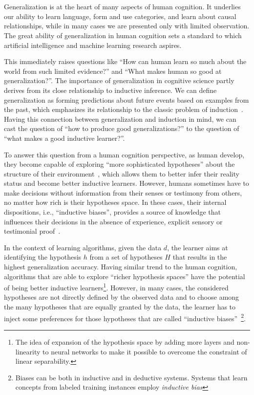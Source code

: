 \part{}
\label{part3}
Generalization is at the heart of many aspects of human cognition. It underlies our ability to learn language, form and use categories, and learn about causal relationships, while in many cases we are presented only with limited observation. The great ability of generalization in human cognition sets a standard to which artificial intelligence and machine learning research aspires.

This immediately raises questions like ``How can human learn so much about the world from such limited evidence?'' and ``What makes human so good at generalization?''.
The importance of generalization in cognitive science partly derives
from its close relationship to inductive inference.  We can define generalization as forming predictions about future events based on examples from the past, which emphasizes its relationship to the classic problem of induction~\citep{hume2003treatise}. 
Having this connection between generalization and induction in mind, we can cast the question of ``how to produce good generalizations?'' to the question of ``what makes a good inductive learner?''.

To answer this question from a human cognition perspective, as human develop, they become capable of exploring ``more sophisticated hypotheses'' about the structure of their environment~\citep{inhelder1958growth}, which allows them to better infer their reality status and become better inductive learners. However, humans sometimes have to make decisions without information from their senses or testimony from others, no matter how rich is their hypotheses space.
In these cases, their internal dispositions, i.e., ``inductive biases'', provides a source of knowledge that influences their decisions in the absence of experience, explicit sensory or testimonial proof~\cite{sodian1987children,griffiths2010probabilistic}.

In the context of learning algorithms, given the data $d$, the learner aims at identifying the hypothesis $h$ from a set of hypotheses $H$ that results in the highest generalization accuracy.  Having similar trend to the human cognition, algorithms that are able to explore ``richer hypothesis spaces'' have the potential of being better inductive learners\footnote{The idea of expansion of the hypothesis space by adding more layers and non-linearity to neural networks to make it possible to overcome the constraint of linear separability.}. However, in many cases, the considered hypotheses are not directly defined by the observed data and to choose among the many hypotheses that are equally granted by the data, the learner has to inject some preferences for those hypotheses that are called ``inductive biases''~\footnote{Biases can be both in inductive and in deductive systems. Systems that learn concepts from labeled training instances employ \emph{inductive bias}}. 

